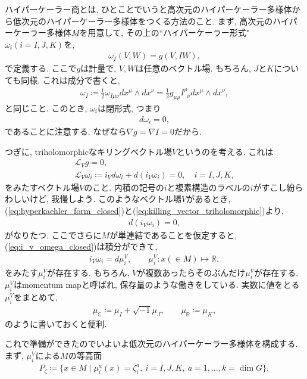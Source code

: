 \documentclass{ltjsarticle}
\theoremstyle{definition}
\begin{document}
ハイパーケーラー商とは, ひとことでいうと高次元のハイパーケーラー多様体から低次元のハイパーケーラー多様体をつくる方法のこと. まず, 高次元のハイパーケーラー多様体$M$を用意して, その上の``ハイパーケーラー形式"$\omega_i(i=I,J,K)$を,
\begin{gather}
  \omega_I(V,W)=g(V,IW),
\end{gather}
で定義する. ここで$g$は計量で, $V,W$は任意のベクトル場. もちろん, $J$と$K$についても同様. これは成分で書くと,
\begin{gather}
  \omega_I\coloneqq\frac12\omega_{I\mu\nu}dx^\mu\wedge dx^\nu=\frac12g_{\mu\rho}I^\rho_{\phantom{\rho}\nu}dx^\mu\wedge dx^\nu,
\end{gather}
と同じこと. このとき, $\omega_i$は閉形式, つまり
\begin{gather}
  d\omega_i=0,\label{eq:hyperkaehler_form_closed}
\end{gather}
であることに注意する. なぜなら$\nabla g=\nabla I=0$だから.\par
つぎに, triholomorphicなキリングベクトル場$V$というのを考える. これは
\begin{gather}
  \mathcal L_Vg=0,\\
  \mathcal L_V\omega_i\coloneqq i_Vd\omega_i+d(i_V\omega_i)=0,\quad i=I,J,K,\label{eq:killing_vector_triholomorphic}
\end{gather}
をみたすベクトル場$V$のこと. 内積の記号の$i$と複素構造のラベルの$i$がすこし紛らわしいけど, 我慢しよう. このようなベクトル場$V$があるとき, (\ref{eq:hyperkaehler_form_closed})と(\ref{eq:killing_vector_triholomorphic})より,
\begin{gather}
  d(i_V\omega_i)=0,\label{eq:i_v_omega_closed}
\end{gather}
がなりたつ. ここでさらに$M$が単連結であることを仮定すると, (\ref{eq:i_v_omega_closed})は積分ができて,
\begin{gather}
  i_V\omega_i=d\mu^V_i,\qquad\mu^V_i:x(\in M)\mapsto\mathbb R,
\end{gather}
をみたす$\mu^V_i$が存在する. もちろん, $V$が複数あったらそのぶんだけ$\mu^V_i$が存在する. $\mu^V_i$はmomentum mapと呼ばれ, 保存量のような働きをしている. 実数に値をとる$\mu^V_i$をまとめて,
\begin{gather}
  \mu_{\mathbb C}\coloneqq\mu_I+\sqrt{-1}\mu_J,\qquad\mu_{\mathbb R}\coloneqq\mu_K,
\end{gather}
のように書いておくと便利.\par
これで準備ができたのでいよいよ低次元のハイパーケーラー多様体を構成する. まず, $\mu^V_i$による$M$の等高面
\begin{gather}
  P_\zeta\coloneqq\{x\in M\mid\mu^a_i(x)=\zeta^a_i,\ i=I,J,K,\ a=1,\dots,k=\dim G\},
\end{gather}
\end{document}
